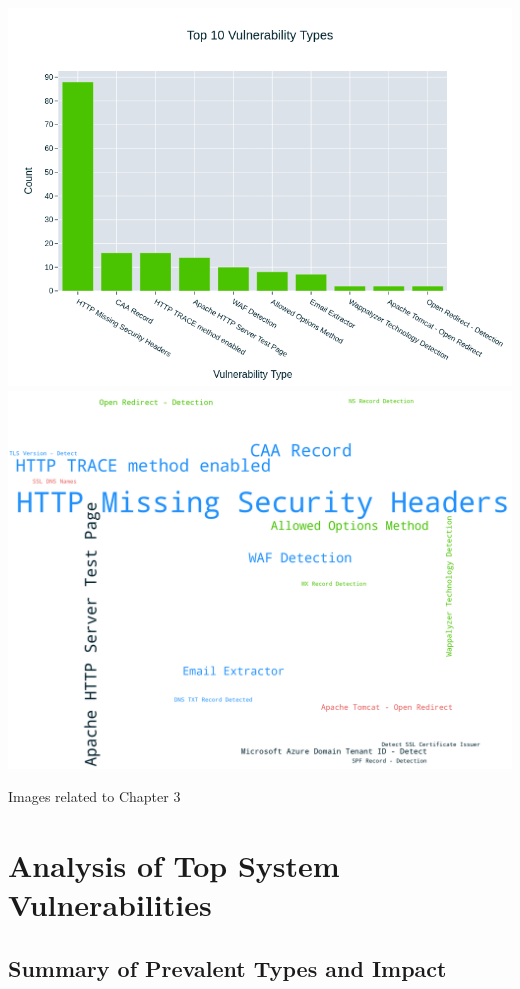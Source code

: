 \begin{center}
\includegraphics[width=\linewidth]{pngs/2_1.png}
\vspace{1cm}\includegraphics[width=\linewidth]{pngs/2_2.png}
\vspace{1cm}\caption{Images related to Chapter 3}
\end{center}
\chapter{Analysis of Top System Vulnerabilities}

\section{Summary of Prevalent Types and Impact}

